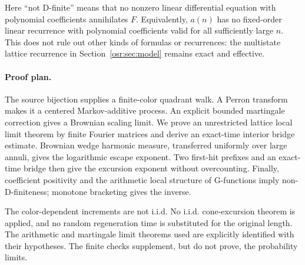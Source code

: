 \documentclass[11pt,letterpaper]{article}
\numberwithin{equation}{section}
\begin{document}
Here ``not D-finite'' means that no nonzero linear differential equation with polynomial coefficients annihilates $F$. Equivalently, $a(n)$ has no fixed-order linear recurrence with polynomial coefficients valid for all sufficiently large $n$. This does not rule out other kinds of formulas or recurrences: the multistate lattice recurrence in Section~\ref{osr:sec:model} remains exact and effective.

\paragraph{Proof plan.}
The source bijection supplies a finite-color quadrant walk. A Perron transform makes it a centered Markov-additive process. An explicit bounded martingale correction gives a Brownian scaling limit. We prove an unrestricted lattice local limit theorem by finite Fourier matrices and derive an exact-time interior bridge estimate. Brownian wedge harmonic measure, transferred uniformly over large annuli, gives the logarithmic escape exponent. Two first-hit prefixes and an exact-time bridge then give the excursion exponent without overcounting. Finally, coefficient positivity and the arithmetic local structure of G-functions imply non-D-finiteness; monotone bracketing gives the inverse.

The color-dependent increments are not i.i.d. No i.i.d. cone-excursion theorem is applied, and no random regeneration time is substituted for the original length. The arithmetic and martingale limit theorems used are explicitly identified with their hypotheses. The finite checks supplement, but do not prove, the probability limits.
\end{document}
